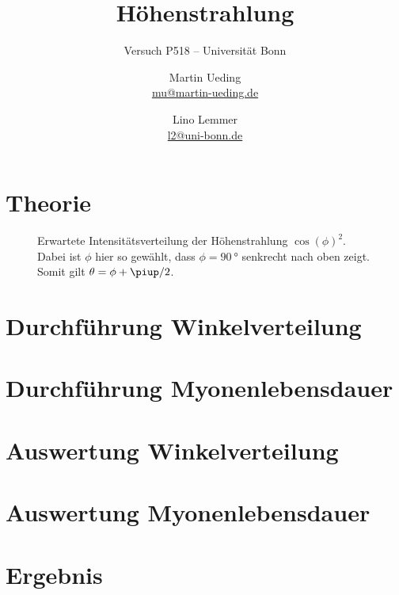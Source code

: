 \documentclass[11pt, ngerman, fleqn, DIV=15, headinclude, BCOR=2cm]{scrreprt}
\title{Höhenstrahlung}
\subtitle{Versuch P518 -- Universität Bonn}
\author{
    Martin Ueding \\ \small{\href{mailto:mu@martin-ueding.de}{mu@martin-ueding.de}}
    \and
    Lino Lemmer \\
    \small{\href{mailto:l2@uni-bonn.de}{l2@uni-bonn.de}}
}
\date{\daterange{2014-07-02}{2014-07-03}}
\begin{document}
\maketitle

\begin{abstract}
\end{abstract}

\tableofcontents

\chapter{Theorie}

\begin{figure}[htbp]
    \centering
    \caption{%
        Erwartete Intensitätsverteilung der Höhenstrahlung $\cos(\phi)^2$.
        Dabei ist $\phi$ hier so gewählt, dass $\phi = \SI{90}{\degree}$
        senkrecht nach oben zeigt. Somit gilt $\theta = \phi + \piup/2$.
    }
    \label{fig:cos2}
\end{figure}

\chapter{Durchführung Winkelverteilung}

\chapter{Durchführung Myonenlebensdauer}

\chapter{Auswertung Winkelverteilung}

\chapter{Auswertung Myonenlebensdauer}

\chapter{Ergebnis}
\end{document}

